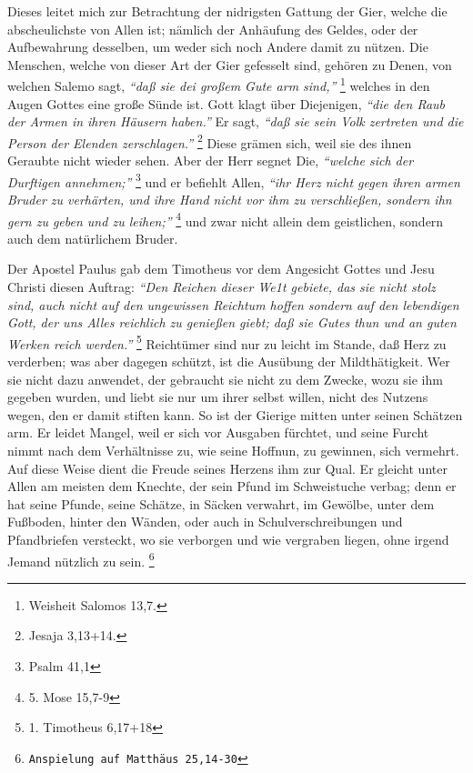 Dieses leitet mich zur Betrachtung der nidrigsten Gattung der Gier, welche die
abscheulichste von Allen ist; nämlich der Anhäufung des Geldes, oder der
Aufbewahrung desselben, um weder sich noch Andere damit zu nützen. Die Menschen,
welche von dieser Art der Gier gefesselt sind, gehören zu Denen, von welchen
Salemo sagt,
\textit{"`daß sie dei großem Gute arm sind,"'}
\footnote{Weisheit Salomos 13,7.}
welches in den Augen Gottes eine große Sünde ist. Gott klagt über Diejenigen,
\textit{"`die den Raub der Armen in ihren Häusern haben."'} Er sagt, \textit{"`daß sie sein Volk
zertreten und die Person der Elenden zerschlagen."'}
\footnote{Jesaja 3,13+14.}
Diese grämen sich, weil sie des ihnen Geraubte nicht wieder sehen. Aber der Herr
segnet Die, \textit{"`welche sich der Durftigen annehmen;"'}
\footnote{Psalm 41,1}
und er
befiehlt Allen,
\textit{"`ihr Herz nicht gegen ihren armen Bruder zu verhärten, und ihre
Hand nicht vor ihm zu verschließen, sondern ihn gern zu geben und zu
leihen;"'}
\footnote{5. Mose 15,7-9}
und zwar nicht allein dem geistlichen,
sondern auch dem natürlichem Bruder.

\medskip

Der Apostel Paulus gab dem Timotheus vor dem Angesicht Gottes und Jesu Christi
diesen Auftrag:
\textit{"`Den Reichen dieser We1t gebiete, das sie nicht stolz sind,
auch nicht auf den ungewissen Reichtum hoffen sondern auf den lebendigen Gott,
der uns Alles reichlich zu genießen giebt; daß sie Gutes thun und an guten
Werken reich werden."'}
\footnote{1. Timotheus 6,17+18}
Reichtümer sind nur zu leicht
im Stande, daß Herz zu verderben; was aber dagegen schützt, ist die Ausübung der
Mildthätigkeit. Wer sie nicht dazu anwendet, der gebraucht sie nicht zu dem
Zwecke, wozu sie ihm gegeben wurden, und liebt sie nur um ihrer selbst willen,
nicht des Nutzens wegen, den er damit stiften kann. So ist der Gierige mitten
unter seinen Schätzen arm. Er leidet Mangel, weil er sich vor Ausgaben fürchtet,
und seine Furcht nimmt nach dem Verhältnisse zu, wie seine Hoffnun, zu gewinnen,
sich vermehrt. Auf diese Weise dient die Freude seines Herzens ihm zur Qual. Er
gleicht unter Allen am meisten dem Knechte, der sein Pfund im Schweistuche
verbag; denn er hat seine Pfunde, seine Schätze, in Säcken verwahrt, im Gewölbe,
unter dem Fußboden, hinter den Wänden, oder auch in Schulverschreibungen und
Pfandbriefen versteckt, wo sie verborgen und wie vergraben liegen, ohne irgend
Jemand nützlich zu sein.
\footnote{\texttt{Anspielung auf Matthäus 25,14-30}}

